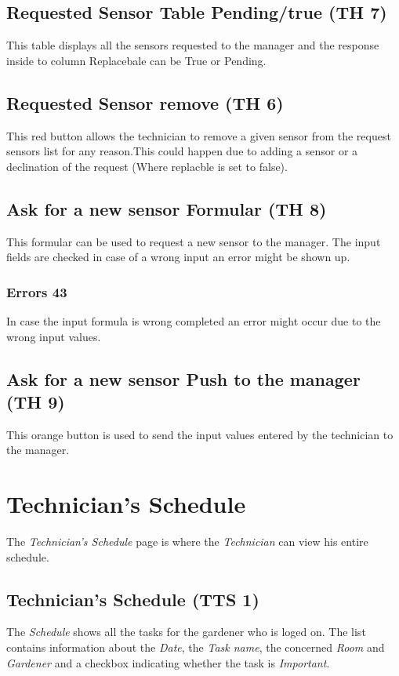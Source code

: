 \subsection{Requested Sensor Table Pending/true (TH 7)}
This table displays all the sensors requested to the manager and the response
inside to column Replacebale can be True or Pending.

\subsection{Requested Sensor remove (TH 6)}
This red button allows the technician to remove a given sensor from the request
sensors list for any reason.This could happen due to adding a sensor or a
declination of the request (Where replacble is set to false).

\subsection{Ask for a new sensor Formular (TH 8)}
This formular can be used to request a new sensor to the manager.
The input fields are checked in case of a wrong input an error might be
shown up.

\subsubsection{Errors 43}
In case the input formula is wrong completed an error might occur due to the
wrong input values.

\subsection{Ask for a new sensor Push to the manager (TH 9)}
This orange button is used to send the input values entered by the technician
to the manager.


\newpage
\section{Technician's Schedule}
\label{sec:appendix_TechnicianSchedule}
\mbox{} \par
\noindent{}

The \emph{Technician's Schedule} page is where the \emph{Technician} can view
his entire schedule.

\subsection{Technician's Schedule (TTS 1)}
The \emph{Schedule} shows all the tasks for the gardener who is loged on. The
list contains information about the \emph{Date}, the \emph{Task name}, the concerned \emph{Room} and \emph{Gardener} and a checkbox indicating
whether the task is \emph{Important}.

